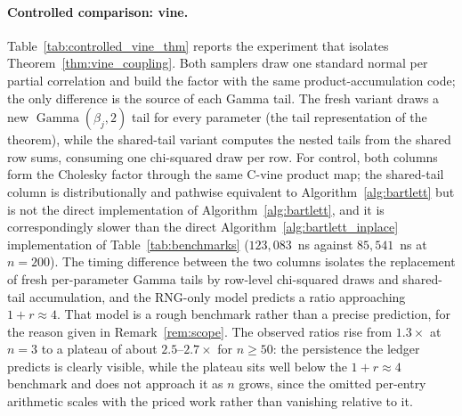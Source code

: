 \documentclass[12pt,english]{article}
\theoremstyle{plain} %
\theoremstyle{definition} %
\theoremstyle{remark} %
\begin{document}
\paragraph{Controlled comparison: vine.}
Table~\ref{tab:controlled_vine_thm} reports the experiment that isolates Theorem~\ref{thm:vine_coupling}. Both samplers draw one standard normal per partial correlation and build the factor with the same product-accumulation code; the only difference is the source of each Gamma tail. The fresh variant draws a new $\operatorname{Gamma}(\beta_j,2)$ tail for every parameter (the tail representation of the theorem), while the shared-tail variant computes the nested tails from the shared row sums, consuming one chi-squared draw per row. For control, both columns form the Cholesky factor through the same C-vine product map; the shared-tail column is distributionally and pathwise equivalent to Algorithm~\ref{alg:bartlett} but is not the direct implementation of Algorithm~\ref{alg:bartlett}, and it is correspondingly slower than the direct Algorithm~\ref{alg:bartlett_inplace} implementation of Table~\ref{tab:benchmarks} ($123{,}083$~ns against $85{,}541$~ns at $n=200$). The timing difference between the two columns isolates the replacement of fresh per-parameter Gamma tails by row-level chi-squared draws and shared-tail accumulation, and the RNG-only model predicts a ratio approaching $1+r\approx4$. That model is a rough benchmark rather than a precise prediction, for the reason given in Remark~\ref{rem:scope}.
The observed ratios rise from $1.3\times$ at $n=3$ to a plateau of about $2.5$--$2.7\times$ for $n\geq50$: the persistence the ledger predicts is clearly visible, while the plateau sits well below the $1+r\approx4$ benchmark and does not approach it as $n$ grows, since the omitted per-entry arithmetic scales with the priced work rather than vanishing relative to it.
\end{document}
